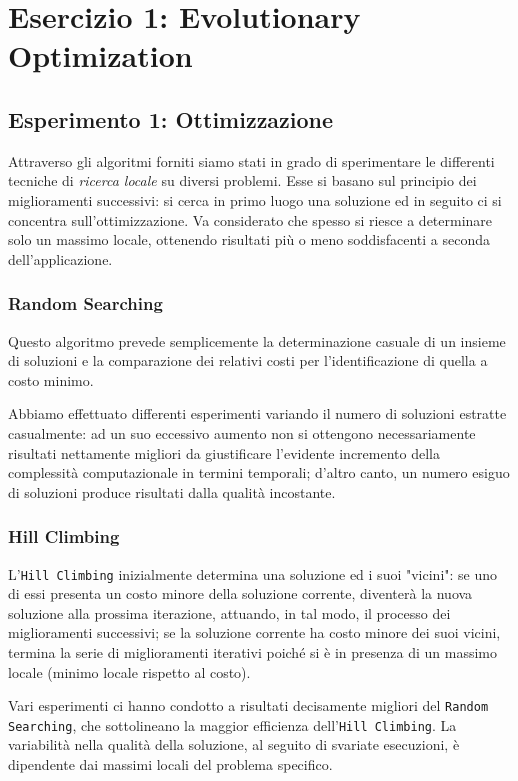 \raggedright
{}
	\label{ch:opt}
	\section{Esercizio 1: Evolutionary Optimization}
		\label{sec:es1}
		\subsection{Esperimento 1: Ottimizzazione}
			Attraverso gli algoritmi forniti siamo stati in grado di sperimentare le differenti tecniche di \emph{ricerca locale} su diversi problemi. Esse si basano sul principio dei miglioramenti successivi: si cerca in primo luogo una soluzione ed in seguito ci si concentra sull'ottimizzazione. Va considerato che spesso si riesce a determinare solo un massimo locale, ottenendo risultati più o meno soddisfacenti a seconda dell'applicazione.
			\subsubsection{Random Searching}
				Questo algoritmo prevede semplicemente la determinazione casuale di un insieme di soluzioni e la comparazione dei relativi costi per l'identificazione di quella a costo minimo.\par
				Abbiamo effettuato differenti esperimenti variando il numero di soluzioni estratte casualmente: ad un suo eccessivo aumento non si ottengono necessariamente risultati nettamente migliori da giustificare l'evidente incremento della complessità computazionale in termini temporali; d'altro canto, un numero esiguo di soluzioni produce risultati dalla qualità incostante.
			\subsubsection{Hill Climbing}
				L'\texttt{Hill Climbing} inizialmente determina una soluzione ed i suoi "vicini": se uno di essi presenta un costo minore della soluzione corrente, diventerà la nuova soluzione alla prossima iterazione, attuando, in tal modo, il processo dei miglioramenti successivi; se la soluzione corrente ha costo minore dei suoi vicini, termina la serie di miglioramenti iterativi poiché si è in presenza di un massimo locale (minimo locale rispetto al costo).\par
				Vari esperimenti ci hanno condotto a risultati decisamente migliori del \texttt{Random Searching}, che sottolineano la maggior efficienza dell'\texttt{Hill Climbing}. La variabilità nella qualità della soluzione, al seguito di svariate esecuzioni, è dipendente dai massimi locali del problema specifico.

